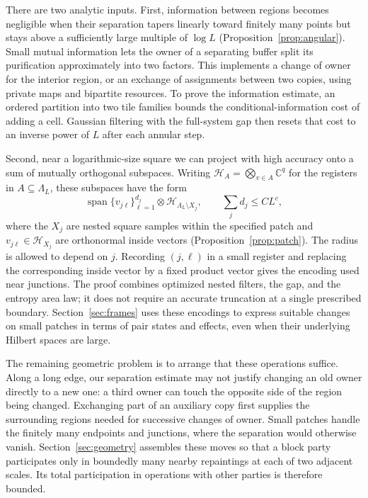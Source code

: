 \documentclass[11pt]{article}
\numberwithin{equation}{section}
\theoremstyle{definition}
\theoremstyle{remark}
\begin{document}
There are two analytic inputs. First, information between regions becomes
negligible when their separation tapers linearly toward finitely many
points but stays above a sufficiently large multiple of $\log L$
(Proposition~\ref{prop:angular}). Small mutual information lets the owner
of a separating buffer split its purification approximately into two
factors. This implements a change of owner for the interior region, or
an exchange of assignments between two copies, using private maps and
bipartite resources. To prove the information estimate, an ordered
partition into two tile families bounds the conditional-information cost
of adding a cell. Gaussian filtering with the full-system gap then resets
that cost to an inverse power of $L$ after each annular step.

Second, near a logarithmic-size square we can project with high accuracy
onto a sum of mutually orthogonal subspaces. Writing
$\mathcal H_A=\bigotimes_{v\in A}\mathbb C^q$ for the registers in
$A\subseteq\Lambda_L$, these subspaces have the form
\[
 \operatorname{span}\{v_{j\ell}\}_{\ell=1}^{d_j}
       \otimes\mathcal H_{\Lambda_L\setminus X_j},
 \qquad \sum_jd_j\le CL^c,
\]
where the $X_j$ are nested square samples within the specified patch and
$v_{j\ell}\in\mathcal H_{X_j}$ are orthonormal inside vectors
(Proposition~\ref{prop:patch}). The radius is allowed to depend on $j$.
Recording $(j,\ell)$ in a small register and replacing the corresponding
inside vector by a fixed product vector gives the encoding used near
junctions. The proof combines optimized nested filters, the gap, and the
entropy area law; it does not require an accurate truncation at a single
prescribed boundary. Section~\ref{sec:frames} uses these encodings to
express suitable changes on small patches in terms of pair states and
effects, even when their underlying Hilbert spaces are large.

The remaining geometric problem is to arrange that these operations
suffice. Along a long edge, our separation estimate may not justify
changing an old owner directly to a new one: a third owner can touch the
opposite side of the region being changed. Exchanging part of an auxiliary copy first supplies the
surrounding regions needed for successive changes of owner. Small patches
handle the finitely many endpoints and junctions, where the separation
would otherwise vanish. Section~\ref{sec:geometry} assembles these moves
so that a block party participates only in boundedly many nearby
repaintings at each of two adjacent scales. Its total participation in
operations with other parties is therefore bounded.
\end{document}
